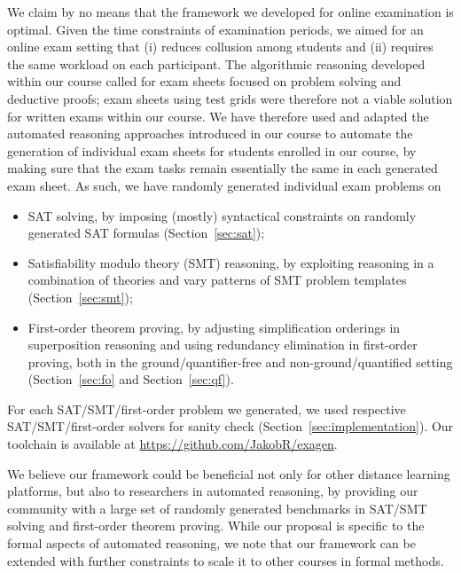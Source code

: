 We claim by no means that the framework we developed for online
examination is optimal.
Given the time constraints of examination periods, we aimed for an
online exam setting that (i) reduces collusion among students and  (ii)
requires the same workload on each participant.
The algorithmic reasoning developed within our
course called for exam sheets focused on problem solving and deductive
proofs;  exam sheets using test grids were therefore not a viable solution
for written exams within our course.
We have therefore used and adapted the automated reasoning approaches introduced in our
course to automate the generation of individual exam sheets for
students enrolled in our course, by making sure that the exam tasks
remain essentially the same in each generated exam sheet. As such, we have randomly generated
individual exam problems on 
\begin{itemize}
\item
    SAT solving, by imposing (mostly) syntactical constraints on
    randomly generated SAT formulas (Section~\ref{sec:sat});
\item Satisfiability modulo theory (SMT) reasoning, by exploiting reasoning in a combination of theories
  and vary patterns of SMT problem templates (Section~\ref{sec:smt}); 
\item First-order theorem proving, by adjusting simplification
  orderings in superposition reasoning and using redundancy elimination
  in first-order proving, both in the ground/quantifier-free 
  and non-ground/quantified setting (Section~\ref{sec:fo}
  and Section~\ref{sec:qf}). 
\end{itemize}
For each SAT/SMT/first-order problem we generated, we used respective
SAT/SMT/first-order solvers for sanity check
(Section~\ref{sec:implementation}). Our toolchain is available at
\url{https://github.com/JakobR/exagen}.

We believe our framework could be beneficial not only for other
distance learning platforms, but also to researchers in automated
reasoning, by providing our community with a large set of randomly generated benchmarks in SAT/SMT solving and first-order theorem proving.
While our proposal is specific to the formal aspects of automated
reasoning, we note that  our framework can be extended with further
constraints to scale it to other courses in formal methods. 
